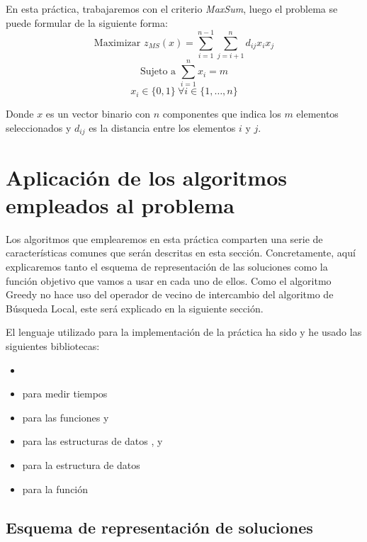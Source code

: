 \documentclass[10pt,a4paper]{article}
\begin{document}
En esta práctica, trabajaremos con el criterio \textit{MaxSum}, luego el problema se puede formular de la siguiente forma:
$$ \text{Maximizar  } z_{MS}(x) = \sum_{i=1}^{n-1} \sum_{j=i+1}^{n} d_{ij} x_i x_j $$
$$ \text{Sujeto a  } \sum_{i=1}^{n} x_i = m $$
$$ x_i \in \{0,1\} \ \forall i \in \{1,\dots,n\} $$

Donde $x$ es un vector binario con $n$ componentes que indica los $m$ elementos seleccionados y $d_{ij}$ es la distancia entre los elementos $i$ y $j$.










\section{Aplicación de los algoritmos empleados al problema}

Los algoritmos que emplearemos en esta práctica comparten una serie de características comunes que serán descritas en esta sección. Concretamente, aquí explicaremos tanto el esquema de representación de las soluciones como la función objetivo que vamos a usar en cada uno de ellos. Como el algoritmo Greedy no hace uso del operador de vecino de intercambio del algoritmo de Búsqueda Local, este será explicado en la siguiente sección.

El lenguaje utilizado para la implementación de la práctica ha sido  y he usado las siguientes bibliotecas:

\begin{itemize}
	\item {}
	\item {} para medir tiempos
	\item {} para las funciones  y 
	\item {} para las estructuras de datos ,  y 
	\item {} para la estructura de datos 
	\item {} para la función 
\end{itemize}


\subsection{Esquema de representación de soluciones}
\end{document}
